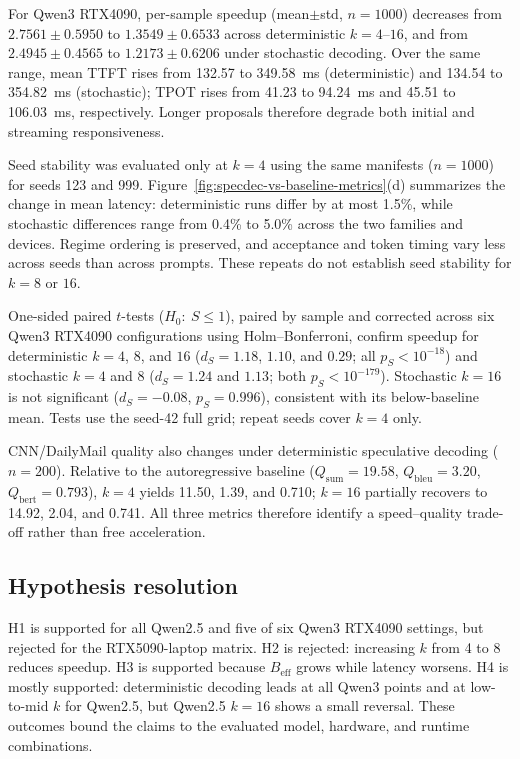 For Qwen3 RTX4090, per-sample speedup (mean$\pm$std, $n{=}1000$) decreases
from $2.7561\pm0.5950$ to $1.3549\pm0.6533$ across deterministic
$k{=}4$--$16$, and from $2.4945\pm0.4565$ to $1.2173\pm0.6206$ under
stochastic decoding. Over the same range, mean TTFT rises from 132.57 to
349.58~ms (deterministic) and 134.54 to 354.82~ms (stochastic); TPOT rises
from 41.23 to 94.24~ms and 45.51 to 106.03~ms, respectively. Longer
proposals therefore degrade both initial and streaming responsiveness.

Seed stability was evaluated only at $k{=}4$ using the same manifests
($n{=}1000$) for seeds 123 and 999. Figure~\ref{fig:specdec-vs-baseline-metrics}(d)
summarizes the change in mean latency: deterministic runs differ by at most
1.5\%, while stochastic differences range from 0.4\% to 5.0\% across the two
families and devices. Regime ordering is preserved, and acceptance and token
timing vary less across seeds than across prompts. These repeats do not
establish seed stability for $k{=}8$ or $16$.

One-sided paired $t$-tests ($H_0{:}\ S\leq1$), paired by sample and corrected
across six Qwen3 RTX4090 configurations using Holm--Bonferroni, confirm
speedup for deterministic $k{=}4$, $8$, and $16$ ($d_S{=}1.18$, $1.10$, and
$0.29$; all $p_S<10^{-18}$) and stochastic $k{=}4$ and $8$
($d_S{=}1.24$ and $1.13$; both $p_S<10^{-179}$). Stochastic
$k{=}16$ is not significant ($d_S{=}-0.08$, $p_S{=}0.996$),
consistent with its below-baseline mean. Tests use the seed-42 full grid;
repeat seeds cover $k{=}4$ only.

CNN/DailyMail quality also changes under deterministic speculative decoding
($n{=}200$). Relative to the autoregressive baseline
($Q_{\mathrm{sum}}{=}19.58$, $Q_{\mathrm{bleu}}{=}3.20$,
$Q_{\mathrm{bert}}{=}0.793$), $k{=}4$ yields 11.50, 1.39, and 0.710;
$k{=}16$ partially recovers to 14.92, 2.04, and 0.741. All three metrics
therefore identify a speed--quality trade-off rather than free acceleration.

\subsection{Hypothesis resolution}

H1 is supported for all Qwen2.5 and five of six Qwen3 RTX4090 settings, but
rejected for the RTX5090-laptop matrix. H2 is rejected: increasing $k$ from
4 to 8 reduces speedup. H3 is supported because $B_{\text{eff}}$ grows while
latency worsens. H4 is mostly supported: deterministic decoding leads at all
Qwen3 points and at low-to-mid $k$ for Qwen2.5, but Qwen2.5 $k{=}16$ shows a
small reversal. These outcomes bound the claims to the evaluated model,
hardware, and runtime combinations.
